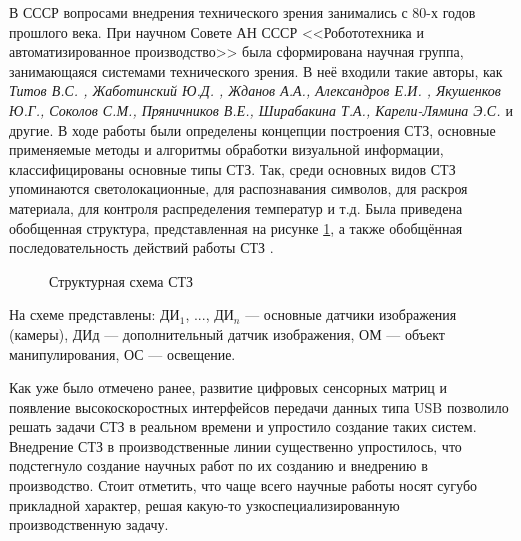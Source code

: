 В СССР вопросами внедрения технического зрения занимались с 80-х годов прошлого века. При научном Совете АН СССР <<Робототехника и автоматизированное производство>> была сформирована научная группа, занимающаяся системами технического зрения. В неё входили такие авторы, как \textit{Титов В.С. \cite{Titov}, Жаботинский Ю.Д. \cite{Gabotinski}, Жданов А.А., Александров Е.И. \cite{Alexandrov}, Якушенков Ю.Г., Соколов С.М., Пряничников В.Е., Ширабакина Т.А., Карели-Лямина Э.С. \cite{Bragin}} и другие. В ходе работы были определены концепции построения СТЗ, основные применяемые методы и алгоритмы обработки визуальной информации, классифицированы основные типы СТЗ. Так, среди основных видов СТЗ упоминаются светолокационные, для распознавания символов, для раскроя материала, для контроля распределения температур и т.д. Была приведена обобщенная структура, представленная на рисунке \cref{fig:stz-ussr}, а также обобщённая последовательность действий работы СТЗ \cite{SpravTZ}.

\begin{figure}[h]
	\caption{Структурная схема СТЗ}\label{fig:stz-ussr}
\end{figure}

На схеме представлены: ДИ$_1$, ..., ДИ$_n$ --- основные датчики изображения (камеры), ДИ{\footnotesize д} --- дополнительный датчик изображения, ОМ --- объект манипулирования, ОС --- освещение.

Как уже было отмечено ранее, развитие цифровых сенсорных матриц и появление высокоскоростных интерфейсов передачи данных типа USB позволило решать задачи СТЗ в реальном времени и упростило создание таких систем. Внедрение СТЗ в производственные линии существенно упростилось, что подстегнуло создание научных работ по их созданию и внедрению в производство. Стоит отметить, что чаще всего научные работы носят сугубо прикладной характер, решая какую-то узкоспециализированную производственную задачу.

